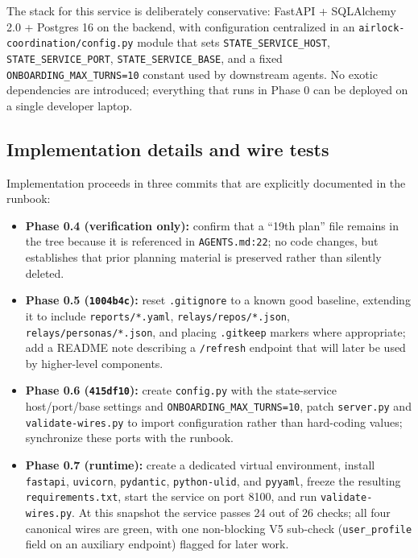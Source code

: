 \documentclass{article}
\providecommand{\tightlist}{\setlength{\itemsep}{0pt}\setlength{\parskip}{0pt}}
\begin{document}
The stack for this service is deliberately conservative: FastAPI +
SQLAlchemy 2.0 + Postgres 16 on the backend, with configuration
centralized in an \texttt{airlock-coordination/config.py} module that
sets \texttt{STATE\_SERVICE\_HOST}, \texttt{STATE\_SERVICE\_PORT},
\texttt{STATE\_SERVICE\_BASE}, and a fixed
\texttt{ONBOARDING\_MAX\_TURNS=10} constant used by downstream agents.
No exotic dependencies are introduced; everything that runs in Phase 0
can be deployed on a single developer laptop.

\subsection{Implementation details and wire
tests}\label{implementation-details-and-wire-tests}

Implementation proceeds in three commits that are explicitly documented
in the runbook:

\begin{itemize}
\tightlist
\item
  \textbf{Phase 0.4 (verification only):} confirm that a ``19th plan''
  file remains in the tree because it is referenced in
  \texttt{AGENTS.md:22}; no code changes, but establishes that prior
  planning material is preserved rather than silently deleted.
\item
  \textbf{Phase 0.5 (\texttt{1004b4c}):} reset \texttt{.gitignore} to a
  known good baseline, extending it to include \texttt{reports/*.yaml},
  \texttt{relays/repos/*.json}, \texttt{relays/personas/*.json}, and
  placing \texttt{.gitkeep} markers where appropriate; add a README note
  describing a \texttt{/refresh} endpoint that will later be used by
  higher-level components.
\item
  \textbf{Phase 0.6 (\texttt{415df10}):} create \texttt{config.py} with
  the state-service host/port/base settings and
  \texttt{ONBOARDING\_MAX\_TURNS=10}, patch \texttt{server.py} and
  \texttt{validate-wires.py} to import configuration rather than
  hard-coding values; synchronize these ports with the runbook.
\item
  \textbf{Phase 0.7 (runtime):} create a dedicated virtual environment,
  install \texttt{fastapi}, \texttt{uvicorn}, \texttt{pydantic},
  \texttt{python-ulid}, and \texttt{pyyaml}, freeze the resulting
  \texttt{requirements.txt}, start the service on port 8100, and run
  \texttt{validate-wires.py}. At this snapshot the service passes 24 out
  of 26 checks; all four canonical wires are green, with one
  non-blocking V5 sub-check (\texttt{user\_profile} field on an
  auxiliary endpoint) flagged for later work.
\end{itemize}
\end{document}
